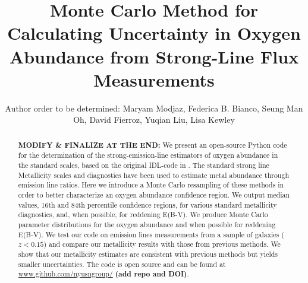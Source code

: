 \documentclass{emulateapj}
\begin{document}
\title{Monte Carlo Method for Calculating Uncertainty in Oxygen Abundance from Strong-Line Flux Measurements}

\author{Author order to be determined: Maryam Modjaz, Federica B. Bianco, Seung Man Oh, David Fierroz, Yuqian Liu, Lisa Kewley}
 
 
\begin{abstract}
\textbf{MODIFY \& FINALIZE AT THE END:} We present an open-source Python code for the determination of the strong-emission-line estimators of oxygen abundance in the standard scales, based on the original IDL-code in \citet{kewley02}. The standard strong line Metallicity scales and diagnostics  have been used to estimate metal abundance through emission line ratios. Here we introduce a Monte Carlo resampling of these methods in order to better characterize an oxygen abundance confidence region.  We output median values, 16th and 84th percentile confidence regions, for various standard metallicity diagnostics, and, when possible, for reddening E(B-V). We produce Monte Carlo parameter distributions for the oxygen abundance and when possible for reddening E(B-V). We test our code on emission lines measurements from a sample of galaxies ($z<0.15$) and compare our metallicity results with those from previous methods. We show that our metallicity estimates are consistent with previous methods but yields smaller uncertainties. The code is open source and can be found at \url{www.github.com/nyusngroup/} \textbf{(add repo and DOI)}.
\end{abstract}
 
\end{document}
